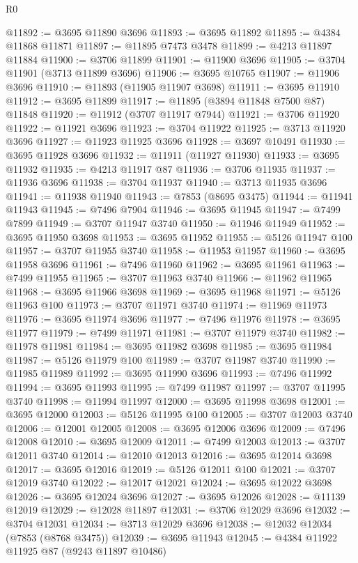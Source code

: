 \begin{lexlean}{R0}
\begin{coremodule}
@11892 := @3695 @11890 @3696
@11893 := @3695 @11892
@11895 := @4384 @11868 @11871
@11897 := @11895 @7473 @3478
@11899 := @4213 @11897 @11884
@11900 := @3706 @11899
@11901 := @11900 @3696
@11905 := @3704 @11901 (@3713 @11899 @3696)
@11906 := @3695 @10765
@11907 := @11906 @3696
@11910 := @11893 (@11905 @11907 @3698)
@11911 := @3695 @11910
@11912 := @3695 @11899
@11917 := @11895 (@3894 @11848 @7500 @87) @11848
@11920 := @11912 (@3707 @11917 @7944)
@11921 := @3706 @11920
@11922 := @11921 @3696
@11923 := @3704 @11922
@11925 := @3713 @11920 @3696
@11927 := @11923 @11925 @3696
@11928 := @3697 @10491
@11930 := @3695 @11928 @3696
@11932 := @11911 (@11927 @11930)
@11933 := @3695 @11932
@11935 := @4213 @11917 @87
@11936 := @3706 @11935
@11937 := @11936 @3696
@11938 := @3704 @11937
@11940 := @3713 @11935 @3696
@11941 := @11938 @11940
@11943 := @7853 (@8695 @3475)
@11944 := @11941 @11943
@11945 := @7496 @7904
@11946 := @3695 @11945
@11947 := @7499 @7899
@11949 := @3707 @11947 @3740
@11950 := @11946 @11949
@11952 := @3695 @11950 @3698
@11953 := @3695 @11952
@11955 := @5126 @11947 @100
@11957 := @3707 @11955 @3740
@11958 := @11953 @11957
@11960 := @3695 @11958 @3696
@11961 := @7496 @11960
@11962 := @3695 @11961
@11963 := @7499 @11955
@11965 := @3707 @11963 @3740
@11966 := @11962 @11965
@11968 := @3695 @11966 @3698
@11969 := @3695 @11968
@11971 := @5126 @11963 @100
@11973 := @3707 @11971 @3740
@11974 := @11969 @11973
@11976 := @3695 @11974 @3696
@11977 := @7496 @11976
@11978 := @3695 @11977
@11979 := @7499 @11971
@11981 := @3707 @11979 @3740
@11982 := @11978 @11981
@11984 := @3695 @11982 @3698
@11985 := @3695 @11984
@11987 := @5126 @11979 @100
@11989 := @3707 @11987 @3740
@11990 := @11985 @11989
@11992 := @3695 @11990 @3696
@11993 := @7496 @11992
@11994 := @3695 @11993
@11995 := @7499 @11987
@11997 := @3707 @11995 @3740
@11998 := @11994 @11997
@12000 := @3695 @11998 @3698
@12001 := @3695 @12000
@12003 := @5126 @11995 @100
@12005 := @3707 @12003 @3740
@12006 := @12001 @12005
@12008 := @3695 @12006 @3696
@12009 := @7496 @12008
@12010 := @3695 @12009
@12011 := @7499 @12003
@12013 := @3707 @12011 @3740
@12014 := @12010 @12013
@12016 := @3695 @12014 @3698
@12017 := @3695 @12016
@12019 := @5126 @12011 @100
@12021 := @3707 @12019 @3740
@12022 := @12017 @12021
@12024 := @3695 @12022 @3698
@12026 := @3695 @12024 @3696
@12027 := @3695 @12026
@12028 := @11139 @12019
@12029 := @12028 @11897
@12031 := @3706 @12029 @3696
@12032 := @3704 @12031
@12034 := @3713 @12029 @3696
@12038 := @12032 @12034 (@7853 (@8768 @3475))
@12039 := @3695 @11943
@12045 := @4384 @11922 @11925 @87 (@9243 @11897 @10486)

\end{coremodule}
\end{lexlean}
